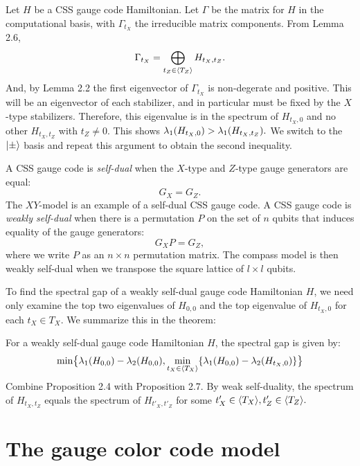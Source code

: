 \doproof
Let $H$ be a CSS gauge code Hamiltonian.
Let $\Gamma$ be the matrix for $H$ in the computational basis,
with $\Gamma_{t_X}$ the irreducible matrix components.
From Lemma 2.6,
$$
    \Gamma_{t_X} = \bigoplus_{t_Z\in\langle T_Z \rangle}
        H_{t_X,t_Z}.
$$
And, by Lemma 2.2 the first eigenvector of $\Gamma_{t_X}$ is 
non-degerate and positive.
This will be an eigenvector of each stabilizer, and in particular
must be fixed by the $X$-type stabilizers.
Therefore, this eigenvalue is in the spectrum of $H_{t_X,0}$ and
no other $H_{t_X,t_Z}$ with $t_Z\ne 0.$
This shows 
$\lambda_1(H_{t_X,0}) > \lambda_1(H_{t_X,t_Z}).$
We switch to the $|{\pm}\rangle$ basis and repeat this argument
to obtain the second inequality.
\tombstone

A CSS gauge code is \emph{self-dual} when the $X$-type and $Z$-type
gauge generators are equal: $$G_X = G_Z.$$
The $XY$-model is an example of a self-dual CSS gauge code.
A CSS gauge code is \emph{weakly self-dual}
when there is a permutation $P$ on the set of $n$ qubits
that induces equality of the gauge generators:
$$
    G_X P = G_Z,
$$
where we write $P$ as an $n\times n$ permutation matrix.
The compass model is then weakly self-dual when we transpose
the square lattice of $l\times l$ qubits.

To find the spectral gap of a weakly self-dual gauge code Hamiltonian $H$,
we need only examine the top two eigenvalues of $H_{0,0}$ and 
the top eigenvalue of $H_{t_X,0}$ for each $t_X\in T_X.$ 
We summarize this in the theorem:

For a weakly self-dual gauge code Hamiltonian $H$,
the spectral gap is given by:
$$
    \min \bigl\{ \lambda_1(H_{0,0}) - \lambda_2(H_{0,0}),
        \min_{t_X\in\langle T_X \rangle} 
         \{ \lambda_1(H_{0,0}) - \lambda_2(H_{t_X,0}) \} \bigr\}
$$
\doproof
Combine Proposition 2.4 with Proposition 2.7.
By weak self-duality, the spectrum of $H_{t_X,t_Z}$ equals
the spectrum of $H_{t'_X,t'_Z}$ for some 
$t'_X\in\langle T_X \rangle, t'_Z\in\langle T_Z \rangle.$
\tombstone


\section{The gauge color code model}

